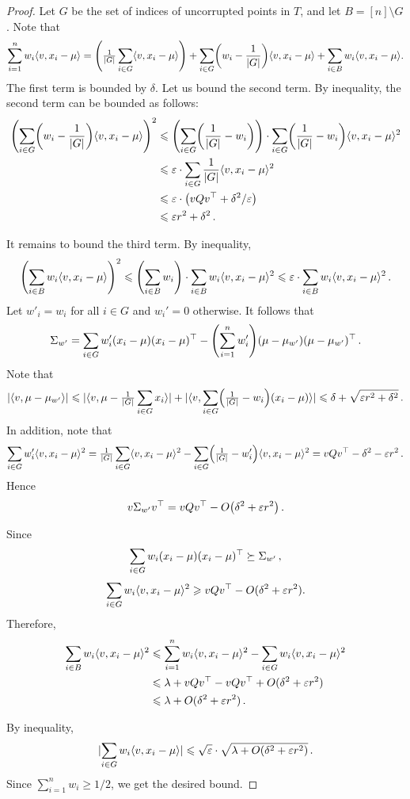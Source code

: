 \begin{proof}
Let $G$ be the set of indices of uncorrupted points in $T$, and let $B = [n]\setminus G$.
Note that
\[
\sum_{i=1}^{n} w_i\iprod{v, x_i - \mu} = \Paren{\tfrac{1}{\card{G}}\sum_{i\in G} \iprod{v,x_i - \mu}}
+ \sum_{i\in G} \Paren{w_i - \frac{1}{\card{G}}} \iprod{v,x_i - \mu} 
+ \sum_{i\in B} w_i \iprod{v,x_i - \mu}. 
\]
The first term is bounded by $\delta$. Let us bound the second term.
By \CS inequality, the second term can be bounded as follows:
\begin{align*}
\Paren{\sum_{i\in G} \Paren{w_i - \frac{1}{\card{G}}} \iprod{v,x_i - \mu}}^2
&\le
\Paren{\sum_{i\in G} \Paren{\frac{1}{\card{G}} - w_i}}
\cdot \sum_{i\in G}  \Paren{\frac{1}{\card{G}} - w_i} \iprod{v,x_i - \mu}^2 
\\&\le \e \cdot \sum_{i\in G}{\frac{1}{\card{G}}} \iprod{v,x_i - \mu}^2 
\\&\le \e \cdot \Paren{vQv^\top + \delta^2/\e}
\\&\le \e r^2 + \delta^2\,.
\end{align*}

It remains to bound the third term. By \CS inequality,
\[
\Paren{\sum_{i\in B} w_i \iprod{v,x_i - \mu}}^2\le
\Paren{\sum_{i\in B} w_i}
\cdot \sum_{i\in B}  w_i \iprod{v,x_i - \mu}^2 
\le
\e \cdot \sum_{i\in B}  w_i \iprod{v,x_i - \mu}^2 \,.
\]
Let $w'_i = w_i$ for all $i\in G$ and $w_i'=0$ otherwise. It follows that
\[
\Sigma_{w'} = \sum_{i\in G} w_i'(x_i-\mu)(x_i-\mu)^\top - \Paren{\sum_{i=1}^n w_i'} (\mu-\mu_{w'})(\mu-\mu_{w'})^\top\,.
\]
Note that
\[
\abs{\iprod{v,\mu-\mu_{w'}}} \le \abs{\iprod{v,\mu-\tfrac{1}{\card{G}}\sum_{i\in G} x_i}} + \abs{\iprod{v,\sum_{i\in G} \Paren{\tfrac{1}{\card{G}}-w_i} \paren{x_i-\mu}}} 
\le \delta + \sqrt{\e r^2 + \delta^2}\,.
\]
In addition, note that
\[
\sum_{i\in G} w_i'\iprod{v, x_i-\mu}^2 = \tfrac{1}{\card{G}}\sum_{i\in G} \iprod{v, x_i-\mu}^2 - 
\sum_{i\in G} \Paren{\tfrac{1}{\card{G}}-w_i'}\iprod{v, x_i-\mu}^2 = vQv^\top - \delta^2 - \e r^2\,.
\]
Hence
\[
v\Sigma_{w'}v^\top = vQv^\top - O\Paren{\delta^2 + \e r^2}\,.
\]

Since
\[
\sum_{i\in G} w_i(x_i-\mu)(x_i-\mu)^\top \succeq \Sigma_{w'}\,,
\]
\[
\sum_{i\in G} w_i \langle v, x_i-\mu\rangle^2 \geqslant vQv^\top - O(\delta^2 + \varepsilon r^2).
\]
Therefore,
\begin{align*}
\sum_{i\in B} w_i \langle v, x_i-\mu\rangle^2 
&\leqslant
\sum_{i=1}^n w_i \langle v, x_i-\mu\rangle^2 - \sum_{i\in G} w_i \langle v, x_i-\mu\rangle^2
\\&\leqslant \lambda + vQv^\top - vQv^\top + O(\delta^2 + \varepsilon r^2)
\\&\leqslant \lambda +  O(\delta^2 + \varepsilon r^2)\,.
\end{align*}

By \CS inequality,
\[
\lvert\sum_{i\in G} w_i \langle v,x_i - \mu\rangle\rvert \leqslant \sqrt{\varepsilon} \cdot \sqrt{\lambda +  O(\delta^2 + \varepsilon r^2)}\,.
\]
Since $\sum_{i=1}^n w_i \ge 1/2$, we get the desired bound.

\end{proof}

